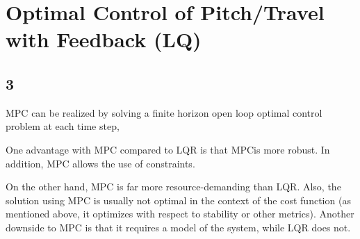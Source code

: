 \section{Optimal Control of Pitch/Travel with Feedback (LQ)}
\subsection{3}
MPC can be realized by solving a finite horizon open loop optimal control problem at each time step, 

One advantage with MPC compared to LQR is that MPCis more robust. In addition, MPC allows the use of constraints.


On the other hand, MPC is far more resource-demanding than LQR. Also, the solution using MPC is usually not optimal in the context of the cost function (as mentioned above, it optimizes with respect to stability or other metrics). Another downside to MPC is that it requires a model of the system, while LQR does not.   

